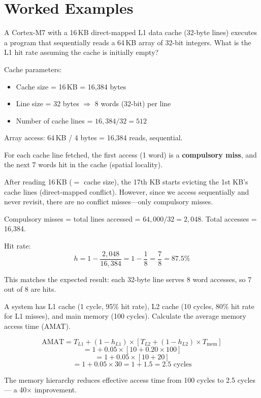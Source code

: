 \section{Worked Examples}
\label{sec:mem:examples}

\begin{example}
A Cortex-M7 with a 16\,KB direct-mapped L1 data cache (32-byte lines) executes a program that sequentially reads a 64\,KB array of 32-bit integers. What is the L1 hit rate assuming the cache is initially empty?

\begin{solution}
Cache parameters:
\begin{itemize}[nosep]
  \item Cache size = 16\,KB = 16{,}384 bytes
  \item Line size = 32 bytes $\Rightarrow$ 8 words (32-bit) per line
  \item Number of cache lines = $16{,}384 / 32 = 512$
\end{itemize}

Array access: 64\,KB / 4 bytes = 16{,}384 reads, sequential.

For each cache line fetched, the first access (1 word) is a \textbf{compulsory miss}, and the next 7 words hit in the cache (spatial locality).

After reading 16\,KB ($= $ cache size), the 17th KB starts evicting the 1st KB's cache lines (direct-mapped conflict). However, since we access sequentially and never revisit, there are no conflict misses---only compulsory misses.

Compulsory misses = total lines accessed = $64{,}000 / 32 = 2{,}048$.
Total accesses = 16{,}384.

Hit rate:
\[
  h = 1 - \frac{2{,}048}{16{,}384} = 1 - \frac{1}{8} = \frac{7}{8} = 87.5\%
\]

This matches the expected result: each 32-byte line serves 8 word accesses, so 7 out of 8 are hits.
\end{solution}
\end{example}

\begin{example}
A system has L1 cache (1 cycle, 95\% hit rate), L2 cache (10 cycles, 80\% hit rate for L1 misses), and main memory (100 cycles). Calculate the average memory access time (AMAT).

\begin{solution}
\[
  \text{AMAT} = T_{L1} + (1 - h_{L1}) \times \left[ T_{L2} + (1 - h_{L2}) \times T_{\text{mem}} \right]
\]
\[
  = 1 + 0.05 \times [10 + 0.20 \times 100]
\]
\[
  = 1 + 0.05 \times [10 + 20]
\]
\[
  = 1 + 0.05 \times 30 = 1 + 1.5 = 2.5 \text{ cycles}
\]

The memory hierarchy reduces effective access time from 100 cycles to 2.5 cycles — a 40$\times$ improvement.
\end{solution}
\end{example}

